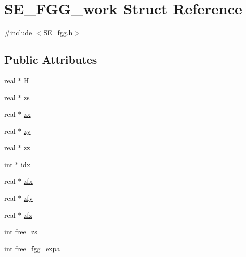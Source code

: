 \hypertarget{structSE__FGG__work}{\section{\-S\-E\-\_\-\-F\-G\-G\-\_\-work \-Struct \-Reference}
\label{structSE__FGG__work}
}


{\ttfamily \#include $<$\-S\-E\-\_\-fgg.\-h$>$}

\subsection*{\-Public \-Attributes}
\begin{DoxyCompactItemize}
\item 
real $\ast$ \hyperlink{structSE__FGG__work_a92e700c7b54315de4df2a0bd4c043188}{\-H}
\item 
real $\ast$ \hyperlink{structSE__FGG__work_a3262546f3a8091c4839492997113ebad}{zs}
\item 
real $\ast$ \hyperlink{structSE__FGG__work_a55f72cf0a709775889220d37dc490956}{zx}
\item 
real $\ast$ \hyperlink{structSE__FGG__work_a89fdd99eae3cfd862b43338c074d1984}{zy}
\item 
real $\ast$ \hyperlink{structSE__FGG__work_a4eab998a78389fe7063fa6972cc9a78d}{zz}
\item 
int $\ast$ \hyperlink{structSE__FGG__work_a7048725ea96be3c76588aad93e3e25d5}{idx}
\item 
real $\ast$ \hyperlink{structSE__FGG__work_ac3eb1da23813cc20c6f141f64eeb668d}{zfx}
\item 
real $\ast$ \hyperlink{structSE__FGG__work_aa61877435a9f8381b917e3c0fc9737cc}{zfy}
\item 
real $\ast$ \hyperlink{structSE__FGG__work_a2ee6c14c25b8a8c7629581d5cf7c2382}{zfz}
\item 
int \hyperlink{structSE__FGG__work_ace7dc175474b7cb63c36c75e7b0165d6}{free\-\_\-zs}
\item 
int \hyperlink{structSE__FGG__work_a257c01a1f7af5016f26ab45f3f52ea6e}{free\-\_\-fgg\-\_\-expa}
\end{DoxyCompactItemize}



